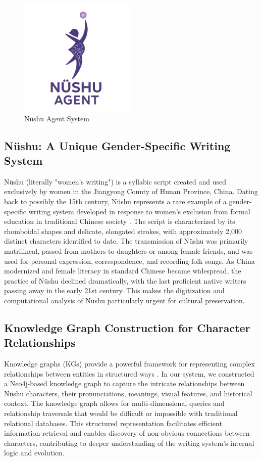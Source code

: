 \documentclass{article}
\begin{document}
    \begin{figure}[H]
    \centering
    \includegraphics[width=0.5\textwidth]{images/nvshu_agent_logo.png}
    \caption{N\"{u}shu Agent System}
    \label{fig:nvshu_agent_logo}
    \end{figure}
    
\subsection{N\"{u}shu: A Unique Gender-Specific Writing System}
\label{ssec:nushu}
    N\"{u}shu (literally "women's writing") is a syllabic script created and used exclusively by women in the Jiangyong County of Hunan Province, China. Dating back to possibly the 15th century, N\"{u}shu represents a rare example of a gender-specific writing system developed in response to women's exclusion from formal education in traditional Chinese society \cite{chen2006nuhanzi}. The script is characterized by its rhomboidal shapes and delicate, elongated strokes, with approximately 2,000 distinct characters identified to date.
    The transmission of N\"{u}shu was primarily matrilineal, passed from mothers to daughters or among female friends, and was used for personal expression, correspondence, and recording folk songs. As China modernized and female literacy in standard Chinese became widespread, the practice of N\"{u}shu declined dramatically, with the last proficient native writers passing away in the early 21st century. This makes the digitization and computational analysis of N\"{u}shu particularly urgent for cultural preservation.

\subsection{Knowledge Graph Construction for Character Relationships}
\label{ssec:kg_intro}
    Knowledge graphs (KGs) provide a powerful framework for representing complex relationships between entities in structured ways \cite{hoganKnowledgeGraphs2022}. In our system, we constructed a Neo4j-based knowledge graph to capture the intricate relationships between N\"{u}shu characters, their pronunciations, meanings, visual features, and historical context.
    The knowledge graph allows for multi-dimensional queries and relationship traversals that would be difficult or impossible with traditional relational databases. This structured representation facilitates efficient information retrieval and enables discovery of non-obvious connections between characters, contributing to deeper understanding of the writing system's internal logic and evolution.
\end{document}
